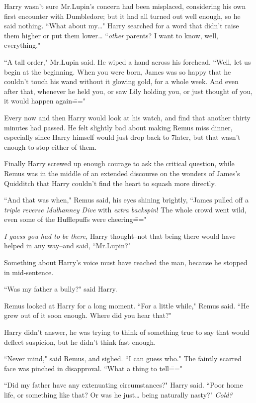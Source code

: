 Harry wasn't sure Mr.\?Lupin's concern had been misplaced, considering his own first encounter with Dumbledore; but it had all turned out well enough, so he said nothing. ``What about my{\ldots}" Harry searched for a word that didn't raise them higher or put them lower{\ldots} ``\emph{other} parents? I want to know, well, everything."

``A tall order," Mr.\?Lupin said. He wiped a hand across his forehead. ``Well, let us begin at the beginning. When you were born, James was so happy that he couldn't touch his wand without it glowing gold, for a whole week. And even after that, whenever he held you, or saw Lily holding you, or just thought of you, it would happen again\==="

\later

Every now and then Harry would look at his watch, and find that another thirty minutes had passed. He felt slightly bad about making Remus miss dinner, especially since Harry himself would just drop back to 7\pm later, but that wasn't enough to stop either of them.

Finally Harry screwed up enough courage to ask the critical question, while Remus was in the middle of an extended discourse on the wonders of James's Quidditch that Harry couldn't find the heart to squash more directly.

``And that was when," Remus said, his eyes shining brightly, ``James pulled off a \emph{triple reverse Mulhanney Dive} with \emph{extra backspin}! The whole crowd went wild, even some of the Hufflepuffs were cheering\==="

\emph{I guess you had to be there,} Harry thought\---not that being there would have helped in any way\---and said, ``Mr.\?Lupin?"

Something about Harry's voice must have reached the man, because he stopped in mid-sentence.

``Was my father a bully?" said Harry.

Remus looked at Harry for a long moment. ``For a little while," Remus said. ``He grew out of it soon enough. Where did you hear that?"

Harry didn't answer, he was trying to think of something true to say that would deflect suspicion, but he didn't think fast enough.

``Never mind," said Remus, and sighed. ``I can guess who." The faintly scarred face was pinched in disapproval. ``What a thing to tell\==="

``Did my father have any extenuating circumstances?" Harry said. ``Poor home life, or something like that? Or was he just{\ldots} being naturally nasty?" \emph{Cold?}


